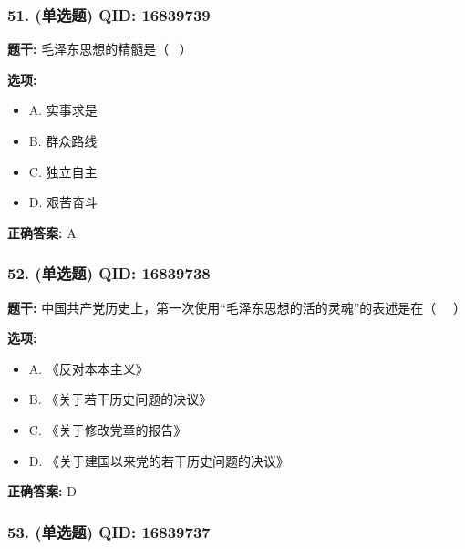 \documentclass[12pt,UTF8]{ctexart}
\begin{document}
\subsubsection*{51. (单选题) \small QID: 16839739}

\textbf{题干:}
毛泽东思想的精髓是（  ）

\textbf{选项:}
\begin{itemize}[leftmargin=*]

  \item A. 实事求是

  \item B. 群众路线

  \item C. 独立自主

  \item D. 艰苦奋斗

\end{itemize}

\textbf{正确答案:}
A

\vspace{0.3em}\hrulefill\vspace{0.7em}

\subsubsection*{52. (单选题) \small QID: 16839738}

\textbf{题干:}
中国共产党历史上，第一次使用“毛泽东思想的活的灵魂”的表述是在（   ）

\textbf{选项:}
\begin{itemize}[leftmargin=*]

  \item A. 《反对本本主义》

  \item B. 《关于若干历史问题的决议》

  \item C. 《关于修改党章的报告》

  \item D. 《关于建国以来党的若干历史问题的决议》

\end{itemize}

\textbf{正确答案:}
D

\vspace{0.3em}\hrulefill\vspace{0.7em}

\subsubsection*{53. (单选题) \small QID: 16839737}
\end{document}
